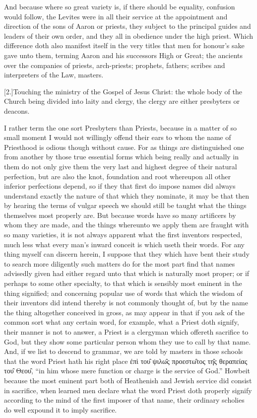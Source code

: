 And because where so great variety is, if there should be equality, confusion would follow, the Levites were in all their service at the appointment and direction of the sons of Aaron or priests, they subject to the principal guides and leaders of their own order, and they all in obedience under the high priest. Which difference doth also manifest itself in the very titles that men for honour’s sake gave unto them, terming Aaron and his successors High or Great; the ancients over the companies of priests, arch-priests; prophets, fathers; scribes and interpreters of the Law, masters.

[2.]Touching the ministry of the Gospel of Jesus Christ: the whole body of the Church being divided into laity and clergy, the clergy are either presbyters or deacons.

I rather term the one sort Presbyters than Priests, because in a matter of so small moment I would not willingly offend their ears to whom the name of Priesthood is odious though  without cause. For as things are distinguished one from another by those true essential forms which being really and actually in them do not only give them the very last and highest degree of their natural perfection, but are also the knot, foundation and root whereupon all other inferior perfections depend, so if they that first do impose names did always understand exactly the nature of that which they nominate, it may be that then by hearing the terms of vulgar speech we should still be taught what the things themselves most properly are. But because words have so many artificers by whom they are made, and the things whereunto we apply them are fraught with so many varieties, it is not always apparent what the first inventors respected, much less what every man’s inward conceit is which useth their words. For any thing myself can discern herein, I suppose that they which have bent their study to  search more diligently such matters do for the most part find that names advisedly given had either regard unto that which is naturally most proper; or if perhaps to some other specialty, to that which is sensibly most eminent in the thing signified; and concerning popular use of words that which the wisdom of their inventors did intend thereby is not commonly thought of, but by the name the thing altogether conceived in gross, as may appear in that if you ask of the common sort what any certain word, for example, what a Priest doth signify, their manner is not to answer, a Priest is a clergyman which offereth sacrifice to God, but they show some particular person whom they use to call by that name. And, if we list to descend to grammar, we are told by masters in those schools that the word Priest hath his right place ἐπὶ του̑ ψιλω̑ς προεστω̑τος τη̑ς θεραπείας του̑ Θεου̑, “in him whose mere function or charge is the service of God.” Howbeit because the most eminent part both of Heathenish and Jewish service did consist in sacrifice, when learned men declare what the word Priest doth properly signify according to the mind of the first imposer of that name, their ordinary scholies do well expound it to imply sacrifice.

